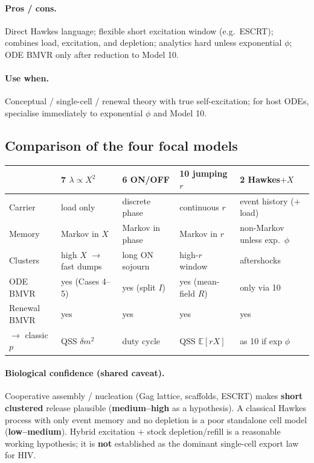 \documentclass[11pt,a4paper]{article}
\newcommand{\E}{\mathbb{E}}
\theoremstyle{plain}
\theoremstyle{definition}
\theoremstyle{remark}
\begin{document}
\paragraph{Pros / cons.}
Direct Hawkes language; flexible short excitation window (e.g.\ ESCRT);
combines load, excitation, and depletion; analytics hard unless exponential
$\phi$; ODE BMVR only after reduction to Model 10.

\paragraph{Use when.}
Conceptual / single-cell / renewal theory with true self-excitation; for host
ODEs, specialise immediately to exponential $\phi$ and Model 10.

\subsection{Comparison of the four focal models}

\begin{center}
\renewcommand{\arraystretch}{1.25}
{\small
\begin{tabular}{@{}p{}p{}p{}p{}p{}@{}}
\toprule
 & \textbf{7} $\lambda\propto X^2$ & \textbf{6} ON/OFF & \textbf{10} jumping $r$ & \textbf{2} Hawkes$+X$ \\
\midrule
Carrier & load only & discrete phase & continuous $r$ & event history ($+$ load) \\
Memory & Markov in $X$ & Markov in phase & Markov in $r$ & non-Markov unless exp.\ $\phi$ \\
Clusters & high $X$ $\to$ fast dumps & long ON sojourn & high-$r$ window & aftershocks \\
ODE BMVR & yes (Cases 4--5) & yes (split $I$) & yes (mean-field $R$) & only via 10 \\
Renewal BMVR & yes & yes & yes & yes \\
$\to$ classic $p$ & QSS $\delta m^2$ & duty cycle & QSS $\E[rX]$ & as 10 if exp $\phi$ \\
\bottomrule
\end{tabular}}
\end{center}

\paragraph{Biological confidence (shared caveat).}
Cooperative assembly / nucleation (Gag lattice, scaffolds, ESCRT) makes
\textbf{short clustered} release plausible (\textbf{medium--high} as a
hypothesis). A classical Hawkes process with only event memory and no
depletion is a poor standalone cell model (\textbf{low--medium}). Hybrid
excitation $+$ stock depletion/refill is a reasonable working hypothesis; it is
\textbf{not} established as the dominant single-cell export law for HIV.
\end{document}
